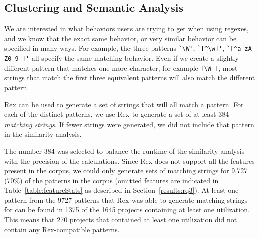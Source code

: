 
\subsection{Clustering and Semantic Analysis}
We are interested in what behaviors users are trying to get when using regexes, and we know that the exact same behavior, or very similar behavior can be specified in many ways.  For example, the three patterns \verb!`\W'!, \verb!`[^\w]'!, \verb!`[^a-zA-Z0-9_]'! all specify the same matching behavior.  Even if we create a slightly different pattern that matches one more character, for example \verb![\W_]!, most strings that match the first three equivalent patterns will also match the different pattern.


Rex can be used to generate a set of strings that will all match a pattern.  For each of the  distinct patterns, we use Rex to generate a set of at least 384 \emph{matching strings}. If fewer strings were generated, we did not include that pattern in the similarity analysis.

The number 384 was selected to balance the runtime of the similarity analysis with the precision of the calculations. Since Rex does not support all the features present in the corpus, we could only generate sets of matching strings for 9,727 (70\%) of the  patterns in the corpus (omitted features are indicated in Table~\ref{table:featureStats} as described in Section~\ref{results:rq3}).  At least one pattern from the 9727 patterns that Rex was able to generate matching strings for can be found in 1375 of the 1645 projects containing at least one utilization.  This means that 270 projects that contained at least one utilization did not contain any Rex-compatible patterns.

